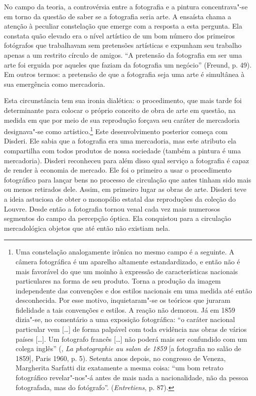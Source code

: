 No campo da teoria, a controvérsia entre a fotografia e a pintura
concentrava"-se em torno da questão de saber se a fotografia seria arte.
A ensaísta chama a atenção à peculiar constelação que emerge com a
resposta a esta pergunta. Ela constata quão elevado era o nível
artístico de um bom número dos primeiros fotógrafos que trabalhavam sem
pretensões artísticas e expunham seu trabalho apenas a um restrito
círculo de amigos. ``A pretensão da fotografia em ser uma arte foi
erguida por aqueles que faziam da fotografia um negócio''
(Freund, p. 49). Em outros termos: a pretensão de que a
fotografia seja uma arte é simultânea à sua emergência como mercadoria.

Esta circunstância tem sua ironia dialética: o procedimento, que mais
tarde foi determinante para colocar o próprio conceito de obra de arte
em questão, na medida em que por meio de sua reprodução forçava seu
caráter de mercadoria designava"-se como artístico.\footnote{Uma
  constelação analogamente irônica no mesmo campo é a seguinte. A câmera
  fotográfica é um aparelho altamente estandardizado, e então não é mais
  favorável do que um moinho à expressão de características nacionais
  particulares na forma de seu produto. Torna a produção da imagem
  independente das convenções e dos estilos nacionais em uma medida até
  então desconhecida. Por esse motivo, inquietaram"-se os teóricos que
  juraram fidelidade a tais convenções e estilos. A reação não demorou.
  Já em 1859 dizia"-se, no comentário a uma exposição fotográfica: ``o
  caráter nacional particular vem {[}\ldots{}{]} de forma palpável com toda
  evidência nas obras de vários países {[}\ldots{}{]}. Um fotografo francês
  {[}\ldots{}{]} não poderá mais ser confundido com um colega inglês'' (, \emph{La photographie au salon de 1859} {[}a fotografia no
  salão de 1859{]}, Paris 1960, p. 5). Setenta anos depois, no congresso
  de Veneza, Margherita Sarfatti diz exatamente a mesma coisa: ``um bom
  retrato fotográfico revelar"-nos"-á antes de mais nada a nacionalidade,
  não da pessoa fotografada, mas do fotógrafo''. (\emph{Entretiens}, p. 87).}
Este desenvolvimento posterior começa com Disderi. Ele sabia que a
fotografia era uma mercadoria, mas este atributo ela compartilha com
todos produtos de nossa sociedade (também a pintura é uma mercadoria).
Disderi reconheceu para além disso qual serviço a fotografia é capaz de
render à economia de mercado. Ele foi o primeiro a usar o procedimento
fotográfico para lançar bens no processo de circulação que antes tinham
sido mais ou menos retirados dele. Assim, em primeiro lugar as obras de
arte. Disderi teve a ideia astuciosa de obter o monopólio estatal das
reproduções da coleção do Louvre. Desde então a fotografia tornou venal
cada vez mais numerosos segmentos do campo da percepção óptica. Ela
conquistou para a circulação mercadológica objetos que até então não
existiam nela.

